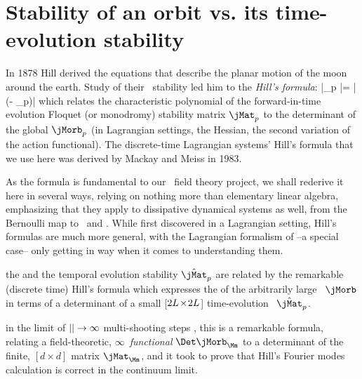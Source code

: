 
\renewcommand{\statesp}{state space}
\renewcommand{\Statesp}{State space}
\renewcommand{\stateDsp}{state-space}
\renewcommand{\StateDsp}{State-space}

\section{%
         Stability of an orbit vs. its time-evolution stability}
\label{s:LC21Hill}

In 1878 Hill derived the equations that describe
the planar motion of the moon around the earth.
Study of their \po\ stability led him to
the
\emph{Hill's formula}:
\beq
\left|\Det\jMorb_p \right|= \left|\det (\id - \jMat_p)\right|
which relates the characteristic polynomial of the forward-in-time
evolution {\po} Floquet (or monodromy) stability matrix $\jMat_p$ to the
determinant of the global {\jacobianOrb} $\jMorb_p$ (in Lagrangian settings,
the Hessian, the second variation of the action functional).
The discrete-time Lagrangian systems' Hill's formula
that we use here was derived by Mackay and Meiss in 1983.

As the formula is fundamental to our \spt\ field theory project, we shall
rederive it here in several ways, relying on nothing more than elementary
linear algebra, emphasizing that they apply to dissipative dynamical
systems as well, from the Bernoulli map to \NS\ and
\KS{}.
While first discovered in a Lagrangian setting, Hill's formulas are much
more general, with the Lagrangian formalism of
 --a special case-- only
getting in way when it comes to understanding them.

the {\jacobianOrb}  and the temporal evolution
 stability ${{\hat{\mathbf{\jMat}}_{p}}}$ are related by
the remarkable (discrete time) Hill's formula
which expresses the  {\HillDet} of the arbitrarily large \jacobianOrb\
$\jMorb$  in terms of a determinant of a small
[$2{L_{}}\!\times\!2{L_{}}$] time-evolution \jacobianM\
$\hat{\mathbf{\jMat}}_p$.


in the
limit of ${||}\to\infty$ multi-shooting steps , this is
a remarkable formula, relating a field-theoretic, $\infty$\dmn\
\emph{functional} {\HillDet} $\Det\jMorb_\Mm$ to a determinant of the
finite, $[d\times{d}]$ matrix $\jMat_\Mm$, and it took
\Poincare\rf{Poinc1886} to prove that Hill's Fourier modes calculation is
correct in the continuum limit.

